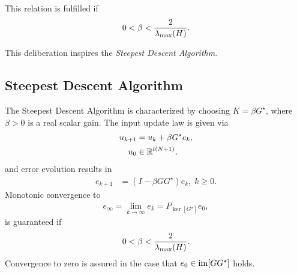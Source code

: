This relation is fulfilled if 
\begin{align}
0 < \beta < \frac{2}{\lambda_{\mathrm{max}}(H)}. 
\end{align}


This deliberation inspires the \textit{Steepest Descent Algorithm}. 

\subsection{Steepest Descent Algorithm}
\begin{alg}
	\label{alg:SDA}
	The Steepest Descent Algorithm is characterized by choosing $K = \beta G^\star$, where $\beta>0$ is a real scalar gain. The input update law is given via 
	\begin{align}
	\label{eq:errSDA}
	\begin{split}
	u_{k+1} &= u_k + \beta G^\star e_k,\\
	u_0 &\in {\mathbb{R}}^{l (N+1)}, 
	\end{split}
	\end{align}
	and error evolution results in 
	\begin{align}
	e_{k+1} &= (I- \beta G G^\star) e_{k}, \; k\geq 0.
	\end{align}
	Monotonic convergence to 
	\begin{align}
	\label{eq:SDAErrLim} 
	e_\infty  = \lim_{k\to\infty} e_k = P_{\ker[G^\star]}e_0,
	\end{align} 
	is guaranteed if
	\begin{align*}
	0 <\beta < \frac{2}{\lambda_{\mathrm{max}}(H)}.
	\end{align*}
	Convergence to zero is assured in the case that $e_0 \in \operatorname{im} [G G^\star]$ holds.
\end{alg} 
